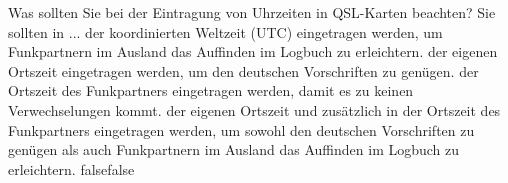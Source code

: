     {Was sollten Sie bei der Eintragung von Uhrzeiten in QSL-Karten beachten? Sie sollten in ...}
    {der koordinierten Weltzeit (UTC) eingetragen werden, um Funkpartnern im Ausland das Auffinden im Logbuch zu erleichtern.}
    {der eigenen Ortszeit eingetragen werden, um den deutschen Vorschriften zu genügen.}
    {der Ortszeit des Funkpartners eingetragen werden, damit es zu keinen Verwechselungen kommt.}
    {der eigenen Ortszeit und zusätzlich in der Ortszeit des Funkpartners eingetragen werden, um sowohl den deutschen Vorschriften zu genügen als auch Funkpartnern im Ausland das Auffinden im Logbuch zu erleichtern.}
    {false}{false}